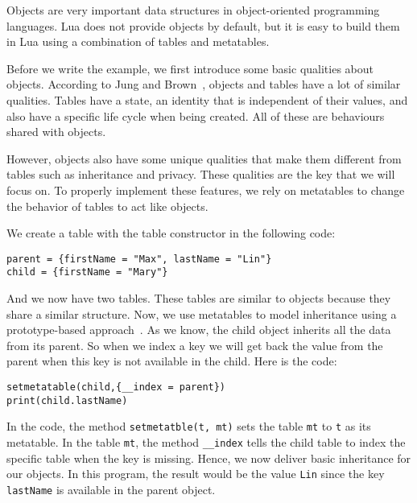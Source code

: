 Objects are very important data structures in object-oriented programming languages. Lua does not provide objects by default, but it is easy to build them in Lua using a combination of tables and metatables.

Before we write the example, we first introduce some basic qualities about objects. According to Jung and Brown~\cite{begLua}, objects and tables have a lot of similar qualities. Tables have a state, an identity that is independent of their values, and also have a specific life cycle when being created. All of these are behaviours shared with objects.

However, objects also have some unique qualities that make them different from tables such as inheritance and privacy. These qualities are the key that we will focus on.
To properly implement these features, we rely on metatables to change the behavior of tables to act like objects.

We create a table with the table constructor in the following code:
\begin{flushleft}
\tt parent = \{firstName = "Max", lastName = "Lin"\} \\
\tt child = \{firstName = "Mary"\} \\
\end{flushleft}
And we now have two tables. These tables are similar to objects because they share a similar structure. Now, we use metatables to model inheritance using a prototype-based approach~\cite{aaa}. As we know, the child object inherits all the data from its parent. So when we index a key we will get back the value from the parent when this key is not available in the child. Here is the code:
\begin{flushleft}
\tt setmetatable(child,\{\_\_index = parent\}) \\
\tt print(child.lastName)\\
\end{flushleft}

In the code, the method {\tt setmetatble(t, mt)} sets the table {\tt mt} to {\tt t} as its metatable. In the table {\tt mt}, the method {\tt \_\_index} tells the child table to index the specific table when the key is missing. Hence, we now deliver basic inheritance for our objects. In this program, the result would be the value {\tt Lin} since the key {\tt lastName} is available in the parent object.
